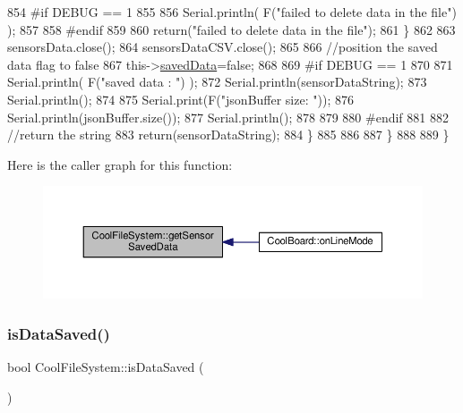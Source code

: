 \begin{DoxyCode}
854 \textcolor{preprocessor}{            #if DEBUG == 1}
855         
856                 Serial.println( F(\textcolor{stringliteral}{"failed to delete data in the file"}) );
857         
858 \textcolor{preprocessor}{            #endif}
859 
860                 \textcolor{keywordflow}{return}(\textcolor{stringliteral}{"failed to delete data in the file"});
861             \}
862 
863             sensorsData.close();
864             sensorsDataCSV.close();
865 
866             \textcolor{comment}{//position the saved data flag to false}
867             this->\hyperlink{classCoolFileSystem_ad398e0c5c41a0c88acdf5d672aa71351}{savedData}=\textcolor{keyword}{false}; 
868             
869 \textcolor{preprocessor}{        #if DEBUG == 1 }
870 
871             Serial.println( F(\textcolor{stringliteral}{"saved data : "}) );
872             Serial.println(sensorDataString);
873             Serial.println();
874 
875             Serial.print(F(\textcolor{stringliteral}{"jsonBuffer size: "}));
876             Serial.println(jsonBuffer.size());
877             Serial.println();
878 
879         
880 \textcolor{preprocessor}{        #endif}
881 
882             \textcolor{comment}{//return the string}
883             \textcolor{keywordflow}{return}(sensorDataString);       
884         \}
885         
886         
887     \}
888 
889 \}
\end{DoxyCode}
Here is the caller graph for this function\+:\nopagebreak
\begin{figure}[H]
\begin{center}
\leavevmode
\includegraphics[width=350pt]{classCoolFileSystem_a5c58bca3735c0ed3efb268d70ef998ef_icgraph}
\end{center}
\end{figure}
\mbox{\label{classCoolFileSystem_a5a7eaeea7a9fbf8aaef651d862fa3b5b}} 
\subsubsection{\texorpdfstring{is\+Data\+Saved()}{isDataSaved()}}
{\footnotesize\ttfamily bool Cool\+File\+System\+::is\+Data\+Saved (\begin{DoxyParamCaption}{ }\end{DoxyParamCaption})}

